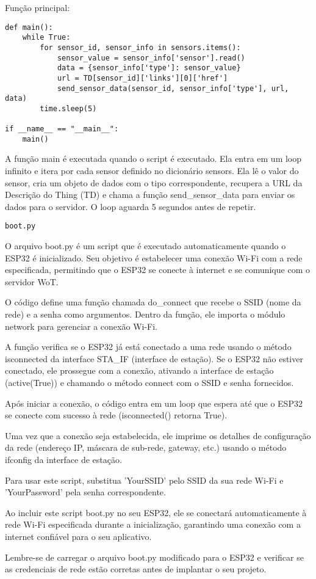 Função principal:
\begin{verbatim}
def main():
    while True:
        for sensor_id, sensor_info in sensors.items():
            sensor_value = sensor_info['sensor'].read()
            data = {sensor_info['type']: sensor_value}
            url = TD[sensor_id]['links'][0]['href']
            send_sensor_data(sensor_id, sensor_info['type'], url, data)
        time.sleep(5)

if __name__ == "__main__":
    main()
\end{verbatim}
A função main é executada quando o script é executado. Ela entra em um loop infinito e itera por cada sensor definido no dicionário sensors. Ela lê o valor do sensor, cria um objeto de dados com o tipo correspondente, recupera a URL da Descrição do Thing (TD) e chama a função send\_sensor\_data para enviar os dados para o servidor. O loop aguarda 5 segundos antes de repetir.

\texttt{boot.py}

O arquivo boot.py é um script que é executado automaticamente quando o ESP32 é inicializado. Seu objetivo é estabelecer uma conexão Wi-Fi com a rede especificada, permitindo que o ESP32 se conecte à internet e se comunique com o servidor WoT.

O código define uma função chamada do\_connect que recebe o SSID (nome da rede) e a senha como argumentos. Dentro da função, ele importa o módulo network para gerenciar a conexão Wi-Fi.

A função verifica se o ESP32 já está conectado a uma rede usando o método isconnected da interface STA\_IF (interface de estação). Se o ESP32 não estiver conectado, ele prossegue com a conexão, ativando a interface de estação (active(True)) e chamando o método connect com o SSID e senha fornecidos.

Após iniciar a conexão, o código entra em um loop que espera até que o ESP32 se conecte com sucesso à rede (isconnected() retorna True).

Uma vez que a conexão seja estabelecida, ele imprime os detalhes de configuração da rede (endereço IP, máscara de sub-rede, gateway, etc.) usando o método ifconfig da interface de estação.

Para usar este script, substitua 'YourSSID' pelo SSID da sua rede Wi-Fi e 'YourPassword' pela senha correspondente.

Ao incluir este script boot.py no seu ESP32, ele se conectará automaticamente à rede Wi-Fi especificada durante a inicialização, garantindo uma conexão com a internet confiável para o seu aplicativo.

Lembre-se de carregar o arquivo boot.py modificado para o ESP32 e verificar se as credenciais de rede estão corretas antes de implantar o seu projeto.
